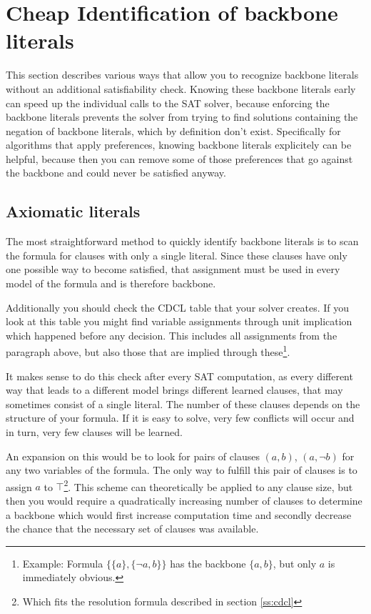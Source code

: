 \section{Cheap Identification of backbone literals}
This section describes various ways that allow you to recognize backbone literals without an additional satisfiability check. Knowing these backbone literals early can speed up the individual calls to the SAT solver, because enforcing the backbone literals prevents the solver from trying to find solutions containing the negation of backbone literals, which by definition don't exist. Specifically for algorithms that apply preferences, knowing backbone literals explicitely can be helpful, because then you can remove some of those preferences that go against the backbone and could never be satisfied anyway.



\subsection{Axiomatic literals}
\label{subsec:axiomatic}
The most straightforward method to quickly identify backbone literals is to scan the formula for clauses with only a single literal. Since these clauses have only one possible way to become satisfied, that assignment must be used in every model of the formula and is therefore backbone.

Additionally you should check the CDCL table that your solver creates. If you look at this table you might find variable assignments through unit implication which happened before any decision. This includes all assignments from the paragraph above, but also those that are implied through these\footnote{Example: Formula $\{\{a\},\{\neg a, b\}\}$ has the backbone $\{a,b\}$, but only $a$ is immediately obvious.}.

It makes sense to do this check after every SAT computation, as every different way that leads to a different model brings different learned clauses, that may sometimes consist of a single literal. The number of these clauses depends on the structure of your formula. If it is easy to solve, very few conflicts will occur and in turn, very few clauses will be learned.

An expansion on this would be to look for pairs of clauses $(a,b)$, $(a,\neg b)$ for any two variables of the formula. The only way to fulfill this pair of clauses is to assign $a$ to $\top$\footnote{Which fits the resolution formula described in 
section \ref{ss:cdcl}}. This scheme can theoretically be applied to any clause size, but then you would require a quadratically increasing number of clauses to determine a backbone which would first increase computation time and secondly decrease the chance that the necessary set of clauses was available.


